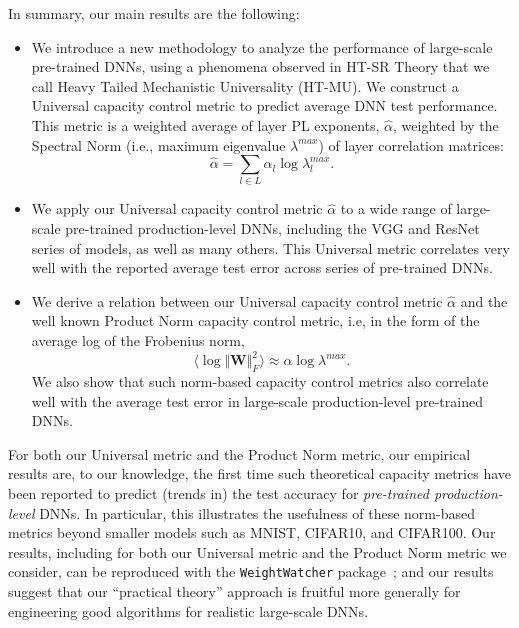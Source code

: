 
In summary, our main results are the following:
\begin{itemize}
\item
We introduce a new methodology to analyze the performance of large-scale pre-trained DNNs, using a phenomena observed in HT-SR Theory that we call Heavy Tailed Mechanistic Universality (HT-MU).
We construct a Universal capacity control metric to predict average DNN test performance.
This metric is a weighted average of layer PL exponents, $\hat{\alpha}$, weighted by the Spectral Norm (i.e., maximum eigenvalue $\lambda^{max}$) of layer correlation matrices: 
$$
\hat{\alpha}=\sum_{l\in L}\alpha_{l}\log\lambda_{l}^{max}  .
$$
\item
We apply our Universal capacity control metric $\hat{\alpha}$ to a wide range of large-scale pre-trained production-level DNNs, including the VGG and ResNet series of models, as well as many others.
This Universal metric correlates very well with the reported average test error across series of pre-trained DNNs.
\item
We derive a relation between our Universal capacity control metric $\hat{\alpha}$ and the well known Product Norm capacity control metric, i.e, in the form of the average log of the Frobenius norm,
$$
\langle\log\Vert\mathbf{W}\Vert^{2}_{F}\rangle\approx \alpha\log\lambda^{max}  .
$$
We also show that
such norm-based capacity control metrics also correlate well with the average test error in large-scale production-level pre-trained DNNs.
\end{itemize}


For both our Universal metric and the Product Norm metric, our empirical results are, to our knowledge, the first time such theoretical capacity metrics have been reported to predict (trends in) the test accuracy for \emph{pre-trained production-level} DNNs.
In particular, this illustrates the usefulness of these norm-based metrics beyond smaller models such as MNIST, CIFAR10, and CIFAR100. 
Our 
results, including for both our Universal metric and the Product Norm metric we consider, can be reproduced with the \texttt{WeightWatcher} package~\cite{weightwatcher_pagkage}; and our
results suggest that our ``practical theory'' approach is fruitful more generally for engineering good algorithms for realistic large-scale DNNs.


